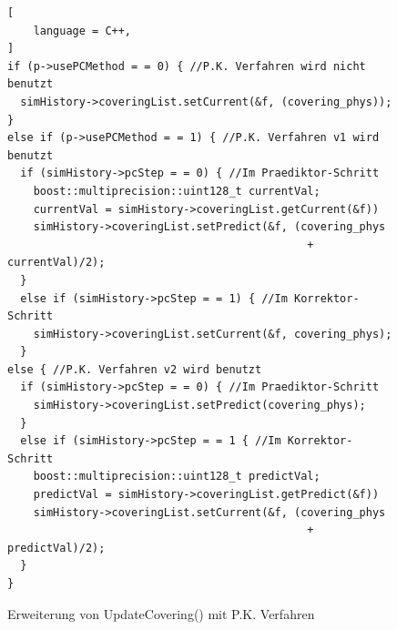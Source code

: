 \documentclass{listhesis}
\begin{document}
\begin{figure}[!h]
\centering
\begin{lstlisting}[
    language = C++,
]
if (p->usePCMethod = = 0) { //P.K. Verfahren wird nicht benutzt
  simHistory->coveringList.setCurrent(&f, (covering_phys));
} 
else if (p->usePCMethod = = 1) { //P.K. Verfahren v1 wird benutzt
  if (simHistory->pcStep = = 0) { //Im Praediktor-Schritt
    boost::multiprecision::uint128_t currentVal;
    currentVal = simHistory->coveringList.getCurrent(&f))
    simHistory->coveringList.setPredict(&f, (covering_phys 
                                              + currentVal)/2);
  } 
  else if (simHistory->pcStep = = 1) { //Im Korrektor-Schritt	
    simHistory->coveringList.setCurrent(&f, covering_phys);
  }
else { //P.K. Verfahren v2 wird benutzt
  if (simHistory->pcStep = = 0) { //Im Praediktor-Schritt
    simHistory->coveringList.setPredict(covering_phys);
  } 
  else if (simHistory->pcStep = = 1 { //Im Korrektor-Schritt	
    boost::multiprecision::uint128_t predictVal;
    predictVal = simHistory->coveringList.getPredict(&f))
    simHistory->coveringList.setCurrent(&f, (covering_phys 
                                              + predictVal)/2);
  }
}
\end{lstlisting}
\caption{Erweiterung von UpdateCovering() mit P.K. Verfahren}
\label{fig:updateCov}
\end{figure}
\end{document}
